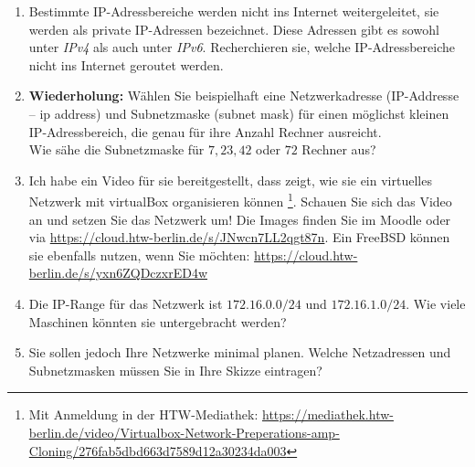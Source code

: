 \documentclass[paper=a4,fontsize=11pt]{scrartcl}%
\numberwithin{equation}{section}
\begin{document}
\begin{enumerate}
\begin{enumerate}
		\item Bestimmte IP-Adressbereiche werden nicht ins Internet weitergeleitet, sie werden als private IP-Adressen bezeichnet. Diese Adressen gibt es sowohl unter \emph{IPv4} als auch unter \emph{IPv6}. Recherchieren sie, welche IP-Adressbereiche nicht ins Internet geroutet werden.
		\item \textbf{Wiederholung:} Wählen Sie beispielhaft eine Netzwerkadresse (IP-Addresse -- ip address) und Subnetzmaske (subnet mask) für einen möglichst kleinen IP-Adressbereich, die genau für ihre Anzahl Rechner ausreicht.\\
		Wie sähe die Subnetzmaske für $7, 23, 42$ oder $72$ Rechner aus? 
		\item Ich habe ein Video für sie bereitgestellt, dass zeigt, wie sie ein virtuelles Netzwerk mit virtualBox organisieren können \footnote{Mit Anmeldung in der HTW-Mediathek: \url{https://mediathek.htw-berlin.de/video/Virtualbox-Network-Preperations-amp-Cloning/276fab5dbd663d7589d12a30234da003}}. Schauen Sie sich das Video an und setzen Sie das Netzwerk um! Die Images finden Sie im Moodle oder via \url{https://cloud.htw-berlin.de/s/JNwcn7LL2qgt87n}. Ein FreeBSD können sie ebenfalls nutzen, wenn Sie möchten: \url{https://cloud.htw-berlin.de/s/yxn6ZQDczxrED4w}
		\item Die IP-Range für das Netzwerk ist $172.16.0.0/24$ und $172.16.1.0/24$. Wie viele Maschinen könnten sie untergebracht werden? 
		\item Sie sollen jedoch Ihre Netzwerke minimal planen. Welche Netzadressen und Subnetzmasken müssen Sie in Ihre Skizze eintragen?
	\end{enumerate}
\end{enumerate}
\end{document}

